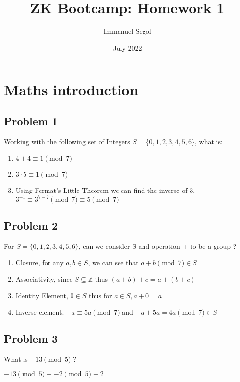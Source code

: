 \documentclass{article}
\title{ZK Bootcamp: Homework 1}
\author{Immanuel Segol}
\date{July 2022}
\begin{document}
\maketitle

\section*{Maths introduction}
\subsection*{Problem 1}
Working with the following set of Integers $S = \{0,1,2,3,4,5,6\}$, what is:
\begin{enumerate}
\item $4+4 \equiv 1 \pmod 7$
\item $3 \cdot 5 \equiv 1 \pmod 7$
\item Using Fermat's Little Theorem we can find the inverse of 3, $3^{-1} \equiv 3^{7-2} \pmod 7 \equiv 5 \pmod 7$
\end{enumerate}
\subsection*{Problem 2}
For $S =\{0,1,2,3,4,5,6\}$, can we consider S and operation + to be a group ?
\begin{enumerate}
\item Closure, for any ${a,b} \in S$, we can see that $a+b \pmod 7 \in S$
\item Associativity, since $S \subseteq \mathbb{Z}$ thus $(a+b)+c = a+(b+c)$
\item Identity Element, $0 \in S$ thus for $a \in S,  a + 0 = a$
\item Inverse element.  $-a \equiv 5a \pmod 7$ and $-a + 5a = 4a \pmod 7 \in S$
\end{enumerate}
\subsection*{Problem 3}
What is $-13 \pmod 5$ ?
\begin{list}
    \item $-13 \pmod 5 \equiv -2 \pmod 5 \equiv 2$
\end{list}
\end{document}
